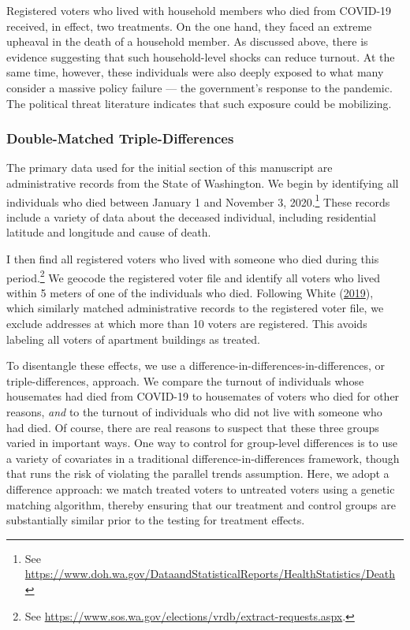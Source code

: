 \documentclass[
  12pt,
]{article}
\begin{document}
Registered voters who lived with household members who died from COVID-19 received, in effect, two treatments. On the one hand, they faced an extreme upheaval in the death of a household member. As discussed above, there is evidence suggesting that such household-level shocks can reduce turnout. At the same time, however, these individuals were also deeply exposed to what many consider a massive policy failure --- the government's response to the pandemic. The political threat literature indicates that such exposure could be mobilizing.

\hypertarget{double-matched-triple-differences}{%
\subsubsection*{Double-Matched Triple-Differences}\label{double-matched-triple-differences}}

The primary data used for the initial section of this manuscript are administrative records from the State of Washington. We begin by identifying all individuals who died between January 1 and November 3, 2020.\footnote{See \url{https://www.doh.wa.gov/DataandStatisticalReports/HealthStatistics/Death}} These records include a variety of data about the deceased individual, including residential latitude and longitude and cause of death.

I then find all registered voters who lived with someone who died during this period.\footnote{See \url{https://www.sos.wa.gov/elections/vrdb/extract-requests.aspx}.} We geocode the registered voter file and identify all voters who lived within 5 meters of one of the individuals who died. Following White (\protect\hyperlink{ref-White2019a}{2019}), which similarly matched administrative records to the registered voter file, we exclude addresses at which more than 10 voters are registered. This avoids labeling all voters of apartment buildings as treated.

To disentangle these effects, we use a difference-in-differences-in-differences, or triple-differences, approach. We compare the turnout of individuals whose housemates had died from COVID-19 to housemates of voters who died for other reasons, \emph{and} to the turnout of individuals who did not live with someone who had died. Of course, there are real reasons to suspect that these three groups varied in important ways. One way to control for group-level differences is to use a variety of covariates in a traditional difference-in-differences framework, though that runs the risk of violating the parallel trends assumption. Here, we adopt a difference approach: we match treated voters to untreated voters using a genetic matching algorithm, thereby ensuring that our treatment and control groups are substantially similar prior to the testing for treatment effects.
\end{document}
